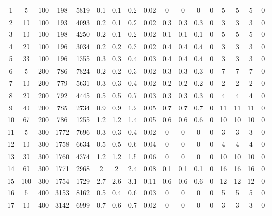 \documentclass[11pt]{article}
\begin{document}
\begin{appendices}
\begin{landscape}
\begin{longtable}[c]{ccccc|cccc|cccc|cccc}
				\endhead
				\rowcolor[HTML]{EFEFEF} 
				1 & 5 & 100 & 198 & 5819 & 0.1 & 0.1 & 0.2 & 0.02 & 0 & 0 & 0 & 0 & 5 & 5 & 5 & 0 \\
				\rowcolor[HTML]{EFEFEF} 
				2 & 10 & 100 & 193 & 4093 & 0.2 & 0.1 & 0.2 & 0.02 & 0.3 & 0.3 & 0.3 & 0 & 3 & 3 & 3 & 0 \\
				\rowcolor[HTML]{EFEFEF} 
				3 & 10 & 100 & 198 & 4250 & 0.2 & 0.1 & 0.2 & 0.02 & 0.1 & 0.1 & 0.1 & 0 & 5 & 5 & 5 & 0 \\
				\rowcolor[HTML]{EFEFEF} 
				4 & 20 & 100 & 196 & 3034 & 0.2 & 0.2 & 0.3 & 0.02 & 0.4 & 0.4 & 0.4 & 0 & 3 & 3 & 3 & 0 \\
				\rowcolor[HTML]{EFEFEF} 
				5 & 33 & 100 & 196 & 1355 & 0.3 & 0.3 & 0.4 & 0.03 & 0.4 & 0.4 & 0.4 & 0 & 3 & 3 & 3 & 0 \\
				6 & 5 & 200 & 786 & 7824 & 0.2 & 0.2 & 0.3 & 0.02 & 0.3 & 0.3 & 0.3 & 0 & 7 & 7 & 7 & 0 \\
				7 & 10 & 200 & 779 & 5631 & 0.3 & 0.3 & 0.4 & 0.02 & 0.2 & 0.2 & 0.2 & 0 & 2 & 2 & 2 & 0 \\
				8 & 20 & 200 & 792 & 4445 & 0.5 & 0.5 & 0.7 & 0.03 & 0.3 & 0.3 & 0.3 & 0 & 4 & 4 & 4 & 0 \\
				9 & 40 & 200 & 785 & 2734 & 0.9 & 0.9 & 1.2 & 0.05 & 0.7 & 0.7 & 0.7 & 0 & 11 & 11 & 11 & 0 \\
				10 & 67 & 200 & 786 & 1255 & 1.2 & 1.2 & 1.4 & 0.05 & 0.6 & 0.6 & 0.6 & 0 & 10 & 10 & 10 & 0 \\
				\rowcolor[HTML]{EFEFEF} 
				11 & 5 & 300 & 1772 & 7696 & 0.3 & 0.3 & 0.4 & 0.02 & 0 & 0 & 0 & 0 & 3 & 3 & 3 & 0 \\
				\rowcolor[HTML]{EFEFEF} 
				12 & 10 & 300 & 1758 & 6634 & 0.5 & 0.5 & 0.6 & 0.04 & 0 & 0 & 0 & 0 & 4 & 4 & 4 & 0 \\
				\rowcolor[HTML]{EFEFEF} 
				13 & 30 & 300 & 1760 & 4374 & 1.2 & 1.2 & 1.5 & 0.06 & 0 & 0 & 0 & 0 & 10 & 10 & 10 & 0 \\
				\rowcolor[HTML]{EFEFEF} 
				14 & 60 & 300 & 1771 & 2968 & 2 & 2 & 2.4 & 0.08 & 0.1 & 0.1 & 0.1 & 0 & 16 & 16 & 16 & 0 \\
				\rowcolor[HTML]{EFEFEF} 
				15 & 100 & 300 & 1754 & 1729 & 2.7 & 2.6 & 3.1 & 0.11 & 0.6 & 0.6 & 0.6 & 0 & 12 & 12 & 12 & 0 \\
				16 & 5 & 400 & 3153 & 8162 & 0.5 & 0.4 & 0.6 & 0.03 & 0 & 0 & 0 & 0 & 5 & 5 & 5 & 0 \\
				17 & 10 & 400 & 3142 & 6999 & 0.7 & 0.6 & 0.7 & 0.02 & 0 & 0 & 0 & 0 & 3 & 3 & 3 & 0 \\

\end{longtable}
\end{landscape}
\end{appendices}
\end{document}
